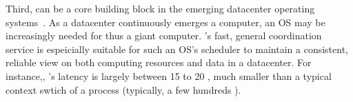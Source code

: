 Third, \xxx can be a core building block in the emerging datacenter operating 
systems~\cite{hotos15, mesos, web-article}. As a datacenter continuously 
emerges a computer, an OS may be increasingly needed for thus a giant 
computer. \xxx's fast, general coordination service is espeicially suitable 
for such an OS's scheduler to maintain a consistent, reliable view on both 
computing resources and data in a datacenter. For instance,, \xxx's latency is 
largely between 15 to 20 \us, much smaller than a typical context swtich of a 
process (typically, a few hundreds \us).
